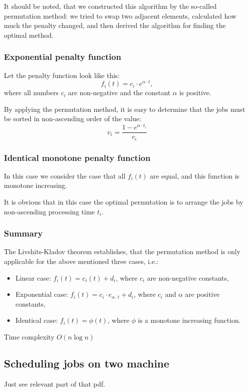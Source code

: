 \documentclass[8pt, a4paper, oneside, twocolumn]{extarticle}
\begin{document}
It should be noted, that we constructed this algorithm by the so-called permutation method: we tried to swap two adjacent elements, calculated how much the penalty changed, and then derived the algorithm for finding the optimal method.
\subsubsection{Exponential penalty function}

Let the penalty function look like this: $$f_i(t) = c_i \cdot e^{\alpha \cdot t},$$ where all numbers $c_i$ are non-negative and the constant $\alpha$ is positive.

By applying the permutation method, it is easy to determine that the jobs must be sorted in non-ascending order of the value: $$v_i = \frac{1 - e^{\alpha \cdot t_i}}{c_i}$$
\subsubsection{Identical monotone penalty function}

In this case we consider the case that all $f_i(t)$ are equal, and this function is monotone increasing.

It is obvious that in this case the optimal permutation is to arrange the jobs by non-ascending processing time $t_i$.
\subsubsection{Summary}
The Livshits-Kladov theorem establishes, that the permutation method is only applicable for the above mentioned three cases, i.e.:
\begin{itemize}
    \item Linear case: $f_i(t) = c_i(t) + d_i$, where $c_i$ are non-negative constants,
    \item Exponential case: $f_i(t) = c_i \cdot e_{\alpha \cdot t} + d_i$, where $c_i$ and $\alpha$ are positive constants,
    \item Identical case: $f_i(t) = \phi(t)$, where $\phi$ is a monotone increasing function.
\end{itemize}
Time complexity $O(n \log n)$
\subsection{Scheduling jobs on two machine}
Just see relevant part of that pdf.
\end{document}
